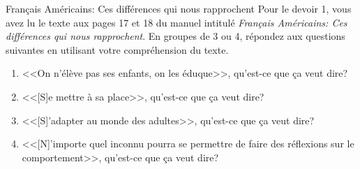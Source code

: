 \begin{frame}{Français Américains: Ces différences qui nous rapprochent}
    Pour le devoir 1, vous avez lu le texte aux pages 17 et 18 du manuel intitulé \emph{Français Américains: Ces différences qui nous rapprochent}.
    En groupes de 3 ou 4, répondez aux questions suivantes en utilisant votre compréhension du texte.
    \begin{enumerate}
      \item {}<<On n'élève pas ses enfants, on les éduque>>, qu'est-ce que ça veut dire?
      \item {}<<[S]e mettre à sa place>>, qu'est-ce que ça veut dire?
      \item {}<<[S]'adapter au monde des adultes>>, qu'est-ce que ça veut dire?
      \item {}<<[N]'importe quel inconnu pourra se permettre de faire des réflexions sur le comportement>>, qu'est-ce que ça veut dire?
    \end{enumerate}

\end{frame}
